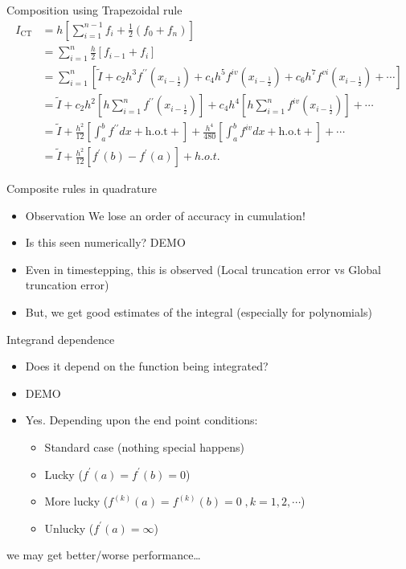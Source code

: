 \documentclass[presentation]{beamer}
\begin{document}
\begin{frame}[label={sec:org7e2539b}]{Composition using Trapezoidal rule}
\[ \begin{aligned} I_{\text{CT}} &= h \left[ \sum_{i=1}^{n-1} f_i +
   \frac{1}{2}(f_0 + f_n) \right] \\
   &= \sum_{i=1}^{n}\frac{h}{2} \left[ f_{i-1} + f_{i}\right] \\
   &= \sum_{i=1}^{n} \left[ \tilde{I} +  c_2{h^3}f^{\prime\prime}(x_{i-\frac{1}{2}}) + c_4{h^5}f^{iv}(x_{i-\frac{1}{2}}) +
   c_6{h^7}f^{vi}(x_{i-\frac{1}{2}}) + \cdots \right] \\
   &= \tilde{I} + c_2h^2 \left[ h \sum_{i=1}^{n}
   f^{\prime\prime}(x_{i-\frac{1}{2}})\right] +  c_4h^4 \left[ h \sum_{i=1}^{n}
   f^{iv}(x_{i-\frac{1}{2}}) \right] + \cdots \\
   &= \tilde{I} + \frac{h^2}{12} \left[ \int_{a}^{b} f^{\prime\prime}dx +
   \text{h.o.t} + \right]  + \frac{h^4}{480} \left[ \int_{a}^{b} f^{iv}dx +
   \text{h.o.t} + \right] + \cdots \\
   &= \tilde{I} + \frac{h^2}{12} \left[ f^\prime(b) - f^\prime(a) \right] + h.o.t.
   \end{aligned}\]
\end{frame}
\begin{frame}[label={sec:org6ccc349}]{Composite rules in quadrature}
\begin{itemize}
\item \alert{Observation} We lose an order of accuracy in cumulation!
\item Is this seen numerically? \alert{DEMO}
\item Even in timestepping, this is observed (\alert{Local} truncation error vs
\alert{Global} truncation error)
\item But, we get good estimates of the integral (especially for polynomials)
\end{itemize}
\end{frame}
\begin{frame}[label={sec:org2d52d05}]{Integrand dependence}
\begin{itemize}
\item Does it depend on the function being integrated?
\item \alert{DEMO}
\item \alert{Yes}. Depending upon the end point conditions:
\begin{itemize}
\item Standard case (nothing special happens)
\item Lucky (\(f^\prime(a) = f^\prime(b) = 0\))
\item More lucky (\(f^{(k)}(a) = f^{(k)}(b) = 0 \;, k = 1,2,\cdots\))
\item Unlucky (\(f^{\prime}(a) = \infty\))
\end{itemize}
\end{itemize}
we may get better/worse performance\ldots{}
\end{frame}
\end{document}
